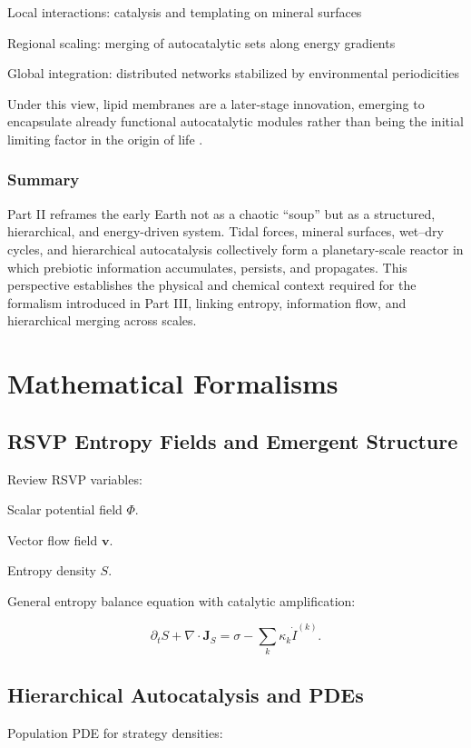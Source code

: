 \documentclass{book}
\begin{document}
Local interactions: catalysis and templating on mineral surfaces \citep{adam2012}

Regional scaling: merging of autocatalytic sets along energy gradients \citep{barge2022}

Global integration: distributed networks stabilized by environmental periodicities \citep{gan2024}

Under this view, lipid membranes are a later-stage innovation, emerging to encapsulate already functional autocatalytic modules rather than being the initial limiting factor in the origin of life \citep{deamer2017}.

\section{Summary}
Part II reframes the early Earth not as a chaotic “soup” but as a structured, hierarchical, and energy-driven system. Tidal forces, mineral surfaces, wet–dry cycles, and hierarchical autocatalysis collectively form a planetary-scale reactor in which prebiotic information accumulates, persists, and propagates. This perspective establishes the physical and chemical context required for the formalism introduced in Part III, linking entropy, information flow, and hierarchical merging across scales.

\part{Mathematical Formalisms}

\chapter{RSVP Entropy Fields and Emergent Structure}
Review RSVP variables:

Scalar potential field $\Phi$.

Vector flow field $\mathbf{v}$.

Entropy density $S$.

General entropy balance equation with catalytic amplification:

\[\partial_t S + \nabla \cdot \mathbf{J}_S = \sigma - \sum_{k} \kappa_k \dot{I}^{(k)}.\]

\chapter{Hierarchical Autocatalysis and PDEs}
Population PDE for strategy densities:
\end{document}

